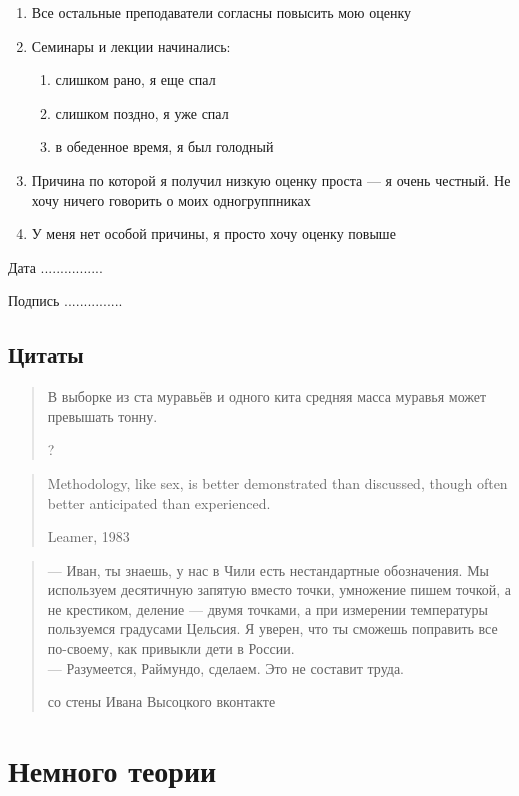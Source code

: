 \documentclass[12pt, a4paper]{article}\usepackage[]{graphicx}\usepackage[]{color}
\begin{document}
\begin{enumerate}
\item Все остальные преподаватели согласны повысить мою оценку
\item Семинары и лекции начинались:
\begin{enumerate}
\item слишком рано, я еще спал
\item слишком поздно, я уже спал
\item в обеденное время, я был голодный
\end{enumerate}
\item Причина по которой я получил низкую оценку проста — я очень честный. Не хочу ничего говорить о моих одногруппниках
\item У меня нет особой причины, я просто хочу оценку повыше
\end{enumerate}


\vspace{10pt}
Дата ................

\vspace{10pt}
Подпись ...............

\subsection{Цитаты}

\blockquote[?]{В выборке из ста муравьёв и одного кита средняя масса муравья может превышать тонну.}

\blockquote[Leamer, 1983]{Methodology, like sex, is better demonstrated than discussed, though often better anticipated than experienced.}



\blockquote[со стены Ивана Высоцкого вконтакте]{
— Иван, ты знаешь, у нас в Чили есть нестандартные обозначения. Мы используем десятичную запятую вместо точки, умножение пишем точкой, а не крестиком, деление — двумя точками, а при измерении температуры пользуемся градусами Цельсия. Я уверен, что ты сможешь поправить все по-своему, как привыкли дети в России. \\

— Разумеется, Раймундо, сделаем. Это не составит труда.}

\section{Немного теории}
\end{document}
